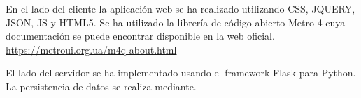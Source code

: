 En el lado del cliente la aplicación web se ha realizado utilizando CSS, JQUERY, JSON, JS y HTML5. Se ha utilizado la librería de código abierto Metro 4 cuya documentación se puede encontrar disponible en la web oficial. \url{https://metroui.org.ua/m4q-about.html}

El lado del servidor se ha implementado usando el framework Flask para Python. La persistencia de datos se realiza mediante.